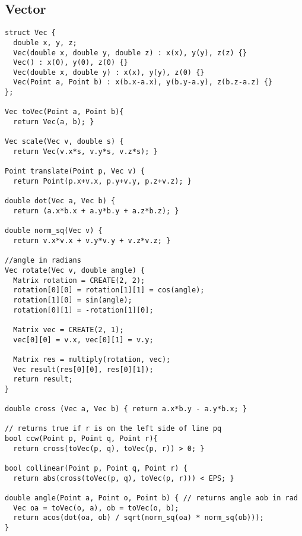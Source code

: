 \documentclass[11pt, oneside]{article}
\begin{document}
\subsection{Vector}
\begin{lstlisting}
struct Vec {
  double x, y, z;
  Vec(double x, double y, double z) : x(x), y(y), z(z) {}
  Vec() : x(0), y(0), z(0) {}
  Vec(double x, double y) : x(x), y(y), z(0) {}
  Vec(Point a, Point b) : x(b.x-a.x), y(b.y-a.y), z(b.z-a.z) {}
};

Vec toVec(Point a, Point b){
  return Vec(a, b); }

Vec scale(Vec v, double s) {
  return Vec(v.x*s, v.y*s, v.z*s); }

Point translate(Point p, Vec v) {
  return Point(p.x+v.x, p.y+v.y, p.z+v.z); }

double dot(Vec a, Vec b) {
  return (a.x*b.x + a.y*b.y + a.z*b.z); }

double norm_sq(Vec v) {
  return v.x*v.x + v.y*v.y + v.z*v.z; }

//angle in radians
Vec rotate(Vec v, double angle) {
  Matrix rotation = CREATE(2, 2);
  rotation[0][0] = rotation[1][1] = cos(angle);
  rotation[1][0] = sin(angle);
  rotation[0][1] = -rotation[1][0];

  Matrix vec = CREATE(2, 1);
  vec[0][0] = v.x, vec[0][1] = v.y;

  Matrix res = multiply(rotation, vec);
  Vec result(res[0][0], res[0][1]);
  return result;
}

double cross (Vec a, Vec b) { return a.x*b.y - a.y*b.x; }

// returns true if r is on the left side of line pq
bool ccw(Point p, Point q, Point r){
  return cross(toVec(p, q), toVec(p, r)) > 0; }

bool collinear(Point p, Point q, Point r) {
  return abs(cross(toVec(p, q), toVec(p, r))) < EPS; }

double angle(Point a, Point o, Point b) { // returns angle aob in rad
  Vec oa = toVec(o, a), ob = toVec(o, b);
  return acos(dot(oa, ob) / sqrt(norm_sq(oa) * norm_sq(ob)));
}
\end{lstlisting}
\end{document}
